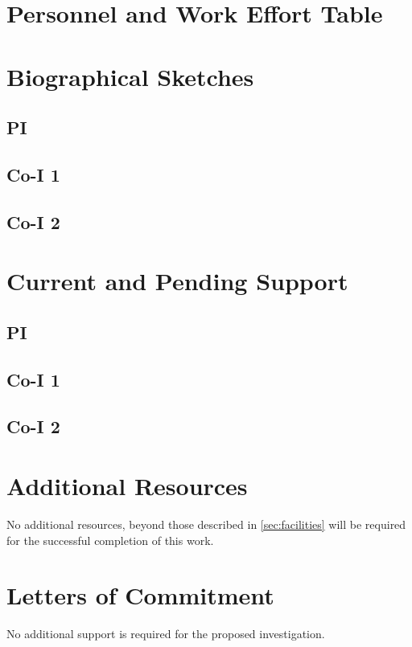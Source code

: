 \documentclass[oneside,12pt]{article}
\begin{document}
    \section{Personnel and Work Effort Table}

    \clearpage

    \section{Biographical Sketches}

    \subsection{PI}

    \subsection{Co-I 1}

    \subsection{Co-I 2}

    \section{Current and Pending Support}

    \subsection{PI}

    \subsection{Co-I 1}
    \subsection{Co-I 2}

    \section{Additional Resources}

    No additional resources, beyond those described in \cref{sec:facilities} will be required for the successful completion of this work.

    \section{Letters of Commitment}

    No additional support is  required for the proposed investigation.
\end{document}
